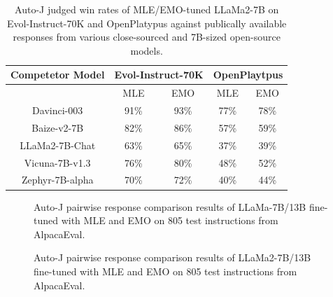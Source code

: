 \begin{table}[h]
    \centering
    \begin{tabular}{c|cc|cc}
    \toprule
    \textbf{Competetor Model} & \multicolumn{2}{c|}{\textbf{Evol-Instruct-70K}} & \multicolumn{2}{c}{\textbf{OpenPlaytpus}} \\
    \midrule
                    & MLE  & EMO  & MLE  & EMO  \\
    \midrule
    Davinci-003     & 91\% & 93\% & 77\% & 78\% \\
    Baize-v2-7B     & 82\% & 86\% & 57\% & 59\% \\
    LLaMa2-7B-Chat  & 63\% & 65\% & 37\% & 39\% \\
    Vicuna-7B-v1.3  & 76\% & 80\% & 48\% & 52\% \\
    Zephyr-7B-alpha & 70\% & 72\% & 40\% & 44\% \\
    \bottomrule
    \end{tabular}
    \caption{Auto-J judged win rates of MLE/EMO-tuned LLaMa2-7B on Evol-Instruct-70K and OpenPlatypus against 
    publically available responses from various close-sourced and 7B-sized open-source models.}
\end{table}

\begin{figure}[h]
    \centering
    \caption{Auto-J pairwise response comparison results of LLaMa-7B/13B fine-tuned with MLE and EMO on 805 test instructions from AlpacaEval.}
    \label{fig:autoj}
\end{figure}
\begin{figure}[h]
    \centering
    \caption{Auto-J pairwise response comparison results of LLaMa2-7B/13B fine-tuned with MLE and EMO on 805 test instructions from AlpacaEval.}
    \label{fig:autoj-llama2}
\end{figure}

